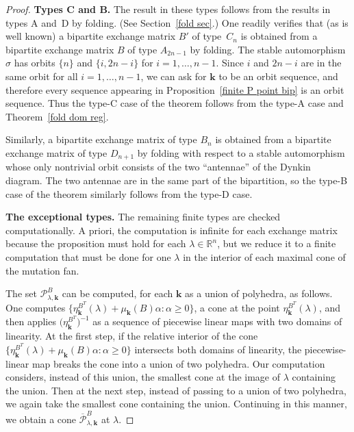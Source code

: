 \documentclass{amsart}
\theoremstyle{definition}
\theoremstyle{remark}
\numberwithin{equation}{section}
\newcommand{\reals}{\mathbb R}
\newcommand{\set}[1]{{\lbrace #1 \rbrace}}
\newcommand{\sett}[1]{{\bigl\lbrace #1 \bigr\rbrace}}
\newcommand{\0}{{\mathbf{0}}}
\newcommand{\kk}{{\boldsymbol{k}}}
\renewcommand{\P}{\mathcal{P}}
\begin{document}
\begin{proof}
\medskip

\noindent
\textbf{Types C and B.} 
The result in these types follows from the results in types A and~D by folding.
(See Section~\ref{fold sec}.)
One readily verifies that (as is well known) a bipartite exchange matrix $B'$ of type~$C_n$ is obtained from a bipartite exchange matrix $B$ of type $A_{2n-1}$ by folding.
The stable automorphism $\sigma$ has orbits $\set{n}$ and $\set{i,2n-i}$ for $i=1,\ldots,n-1$.
Since $i$ and $2n-i$ are in the same orbit for all $i=1,\ldots,n-1$, we can ask for $\kk$ to be an orbit sequence, and therefore every sequence appearing in Proposition~\ref{finite P point bip} is an orbit sequence.
Thus the type-C case of the theorem follows from the type-A case and Theorem~\ref{fold dom reg}.

Similarly, a bipartite exchange matrix of type $B_n$ is obtained from a bipartite exchange matrix of type $D_{n+1}$ by folding with respect to a stable automorphism whose only nontrivial orbit consists of the two ``antennae'' of the Dynkin diagram.
The two antennae are in the same part of the bipartition, so the type-B case of the theorem similarly follows from the type-D case.

\medskip

\noindent
\textbf{The exceptional types.}
The remaining finite types are checked computationally.
A priori, the computation is infinite for each exchange matrix because the proposition must hold for each $\lambda\in\reals^n$, but we reduce it to a finite computation that must be done for one $\lambda$ in the interior of each maximal cone of the mutation fan.

The set $\P^B_{\lambda,\kk}$ can be computed, for each $\kk$ as a union of polyhedra, as follows.
One computes $\sett{\eta_\kk^{B^T}(\lambda)+\mu_\kk(B)\alpha:\alpha\ge0}$, a cone at the point $\eta_\kk^{B^T}(\lambda)$, and then applies $\bigl(\eta_{\kk}^{B^T}\bigr)^{-1}$ as a sequence of piecewise linear maps with two domains of linearity.
At the first step, if the relative interior of the cone $\sett{\eta_\kk^{B^T}(\lambda)+\mu_\kk(B)\alpha:\alpha\ge0}$ intersects both domains of linearity, the piecewise-linear map breaks the cone into a union of two polyhedra.
Our computation considers, instead of this union, the smallest cone at the image of $\lambda$ containing the union.
Then at the next step, instead of passing to a union of two polyhedra, we again take the smallest cone containing the union.  
Continuing in this manner, we obtain a cone $\overline{\P}^B_{\lambda,\kk}$ at $\lambda$.


\end{proof}
\end{document}
